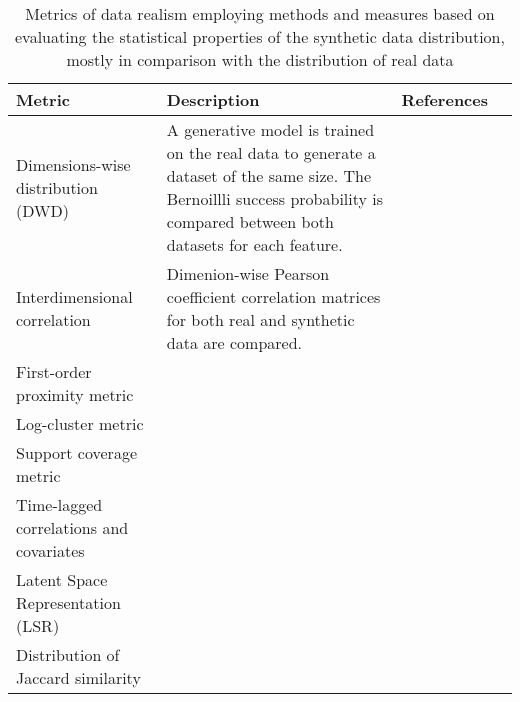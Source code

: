 \begin{table}
    \caption{Metrics of data realism employing methods and measures based on evaluating the statistical properties of the synthetic data distribution, mostly in comparison with the distribution of real data\label{tab:statmetrics}} 
    
    \begin{tabular}{@{} p{} p{} p{} p{} @{}}\toprule
        Metric & Description & References\\ \midrule
        Dimensions-wise distribution (DWD) & A generative model is trained on the real data to generate a dataset of the same size. The Bernoillli success probability is compared between both datasets for each feature. & \cite{Beaulieu-Jones2019-ct,choi2017generating,chin2019generation,yan2020generating,Baowaly2019,Baowaly_2019,ozyigit2020generation}\\
        Interdimensional correlation & Dimenion-wise Pearson coefficient correlation matrices for both real and synthetic data are compared. & \cite{Beaulieu-Jones2019-ct, Goncalves2020}\cite{torfi2019generating,Frid_Adar_2018,Yang_2019,ozyigit2020generation}\\
        First-order proximity metric & {} & \cite{Zhang2020-wp}\\
        Log-cluster metric & {} & \cite{Goncalves2020}\\
        Support coverage metric & {} & \cite{Goncalves2020}\\
        Time-lagged correlations and covariates & {} & \cite{Fisher2019,walsh2020generating}\\
        Latent Space Representation (LSR) & {} & \cite{yan2020generating}\\
        Distribution of Jaccard similarity & {} & \cite{ozyigit2020generation}\\
        \bottomrule
    \end{tabular}
\end{table}

